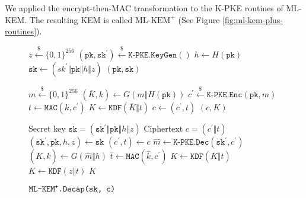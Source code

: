 \documentclass[journal=tches,submission]{iacrtrans}
\newcommand{\keygen}{\texttt{KeyGen}}
\newcommand{\encrypt}{\texttt{Enc}}
\newcommand{\decrypt}{\texttt{Dec}}
\newcommand{\encap}{\texttt{Encap}}
\newcommand{\decap}{\texttt{Decap}}
\newcommand{\mac}{\texttt{MAC}}
\newcommand{\pk}{\texttt{pk}}
\newcommand{\sk}{\texttt{sk}}
\newcommand{\leftsample}{\stackrel{\$}{\leftarrow}}
\def\mlkemplus{\text{ML-KEM}^+}
\begin{document}
We applied the encrypt-then-MAC transformation to the K-PKE routines of ML-KEM. The resulting KEM is called $\mlkemplus$ (See Figure \ref{fig:ml-kem-plus-routines}).

\begin{figure}[h]
    \centering

    \begin{minipage}[t]{0.5\textwidth}
        \begin{algorithm}[H]
            \caption*{$\texttt{ML-KEM}^\texttt{+}\texttt{.}\keygen\texttt{()}$}
            \begin{algorithmic}[1]
                \State $z \leftsample \{0,1\}^{256}$
                \State $(\pk, \sk^\prime) \leftsample \texttt{K-PKE}.\keygen()$
                \State $h \leftarrow H(\pk)$
                \State $\sk \leftarrow (sk^\prime \Vert \pk \Vert h \Vert z)$
                \State \Return $(\pk, \sk)$
            \end{algorithmic}
        \end{algorithm}\vspace{-0.5cm}
        \begin{algorithm}[H]
            \caption*{$\texttt{ML-KEM}^\texttt{+}\texttt{.}\encap\texttt{(\pk)}$}
            \begin{algorithmic}[1]
                \State $m \leftsample \{0,1\}^{256}$
                \State $(\overline{K}, k) \leftarrow G(m \Vert H(\pk))$
                \State $c^\prime \leftsample \texttt{K-PKE}.\encrypt(\pk, m)$
                \State $t \leftarrow \mac(k, c^\prime)$
                \State $K \leftarrow \texttt{KDF}(\overline{K} \Vert t)$
                \State $c \leftarrow (c^\prime, t)$
                \State \Return $(c, K)$
            \end{algorithmic}
        \end{algorithm}
    \end{minipage}\hfill
    \begin{minipage}[t]{0.49\textwidth}
        \begin{algorithm}[H]
            \caption*{$\texttt{ML-KEM}^\texttt{+}\texttt{.}\decap\texttt{(\sk, c)}$}
            \begin{algorithmic}[1]
                \Require Secret key $\sk = (\sk^\prime \Vert \pk \Vert h \Vert z)$
                \Require Ciphertext $c = (c^\prime \Vert t)$
                \State $(\sk^\prime, \pk, h, z) \leftarrow \sk$
                \State $(c^\prime, t) \leftarrow c$
                \State $\hat{m} \leftarrow \texttt{K-PKE}.\decrypt(\sk^\prime, c^\prime)$
                \State $(\overline{K}, \hat{k}) \leftarrow G(\hat{m} \Vert h)$
                \State $\hat{t} \leftarrow \mac(\hat{k}, c^\prime)$
                    \State $K \leftarrow \texttt{KDF}(\overline{K} \Vert t)$
                \Else
                    \State $K \leftarrow \texttt{KDF}(z \Vert t)$
                \EndIf
                \State \Return $K$
            \end{algorithmic}
        \end{algorithm}
    \end{minipage}


\end{figure}
\end{document}
